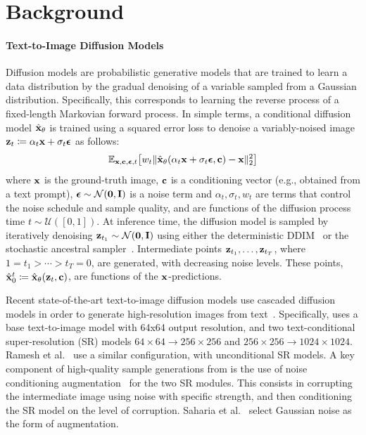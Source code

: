\section*{Background}
\paragraph{Text-to-Image Diffusion Models}
Diffusion models are probabilistic generative models that are trained to learn a data distribution by the gradual denoising of a variable sampled from a Gaussian distribution. Specifically, this corresponds to learning the reverse process of a fixed-length Markovian forward process. In simple terms, a conditional diffusion model $\hat{\mathbf{x}}_\theta$ is trained using a squared error loss to denoise a variably-noised image $\mathbf{z}_t \coloneqq \alpha_t \mathbf{x} + \sigma_t {\boldsymbol{\epsilon}}$ as follows:
\begin{equation}
\label{eq:diffusion_supp}
    \mathbb{E}_{\mathbf{x},\mathbf{c},{\boldsymbol{\epsilon}},t}\!\left[w_t \|\hat{\mathbf{x}}_\theta(\alpha_t \mathbf{x} + \sigma_t {\boldsymbol{\epsilon}}, \mathbf{c}) - \mathbf{x} \|^2_2\right]
\end{equation}
where $\mathbf{x}$ is the ground-truth image, $\mathbf{c}$ is a conditioning vector (e.g., obtained from a text prompt), ${\boldsymbol{\epsilon}} \sim \mathcal{N}(\mathbf{0}, \mathbf{I})$ is a noise term and $\alpha_t, \sigma_t, w_t$ are terms that control the noise schedule and sample quality, and are functions of the diffusion process time $t \sim \mathcal{U}([0, 1])$.
At inference time, the diffusion model is sampled by iteratively denoising $\mathbf{z}_{t_1} \sim \mathcal{N}(\mathbf{0}, \mathbf{I})$ using either the deterministic DDIM~\cite{song2020denoising} or the stochastic ancestral sampler~\cite{ho2020denoising}. Intermediate points $\mathbf{z}_{t_1}, \dotsc, \mathbf{z}_{t_T}$, where $1 = t_1 > \cdots > t_T = 0$, are generated, with decreasing noise levels. These points, $\hat{\mathbf{x}}^t_0 \coloneqq \hat{\mathbf{x}}_\theta(\mathbf{z}_t, \mathbf{c})$, are functions of the $\mathbf{x}$-predictions.

Recent state-of-the-art text-to-image diffusion models use cascaded diffusion models in order to generate high-resolution images from text~\cite{saharia2022photorealistic,ramesh2022hierarchical}. Specifically, \cite{saharia2022photorealistic} uses a base text-to-image model with 64x64 output resolution, and two text-conditional super-resolution (SR) models $64\times 64 \rightarrow 256\times 256$ and $256\times 256 \rightarrow 1024\times 1024$. Ramesh et al.~\cite{ramesh2022hierarchical} use a similar configuration, with unconditional SR models. A key component of high-quality sample generations from \cite{saharia2022photorealistic} is the use of noise conditioning augmentation~\cite{ho2022cascaded} for the two SR modules. This consists in corrupting the intermediate image using noise with specific strength, and then conditioning the SR model on the level of corruption. Saharia et al.~\cite{saharia2022photorealistic} select Gaussian noise as the form of augmentation.

